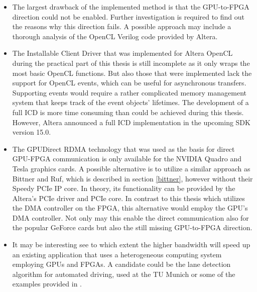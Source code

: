\begin{itemize}
\item The largest drawback of the implemented method is that the GPU-to-FPGA direction could not be enabled.
Further investigation is required to find out the reasons why this direction fails.
A possible approach may include a thorough analysis of the OpenCL Verilog code provided by Altera.
\item The Installable Client Driver that was implemented for Altera OpenCL during the practical part of this thesis is still incomplete as it only wraps the most basic OpenCL functions.
But also those that were implemented lack the support for OpenCL events, which can be useful for asynchronous transfers.
Supporting events would require a rather complicated memory management system that keeps track of the event objects' lifetimes.
The development of a full ICD is more time consuming than could be achieved during this thesis.
However, Altera announced a full ICD implementation in the upcoming SDK version 15.0.

\item The GPUDirect RDMA technology that was used as the basis for direct GPU-FPGA communication is only available for the NVIDIA Quadro and Tesla graphics cards.
A possible alternative is to utilize a similar approach as Bittner and Ruf, which is described in section \ref{bittner}, however without their Speedy PCIe IP core.
In theory, its functionality can be provided by the Altera's PCIe driver and PCIe core.
In contrast to this thesis which utilizes the DMA controller on the FPGA, this alternative would employ the GPU's DMA controller.
Not only may this enable the direct communication also for the popular GeForce cards but also the still missing GPU-to-FPGA direction.

\item It may be interesting see to which extent the higher bandwidth will speed up an existing application that uses a heterogeneous computing system employing GPUs and FPGAs.
A candidate could be the lane detection algorithm for automated driving, used at the TU Munich \cite{lanedetection} or some of the examples provided in \cite{chimera}.



\end{itemize}






